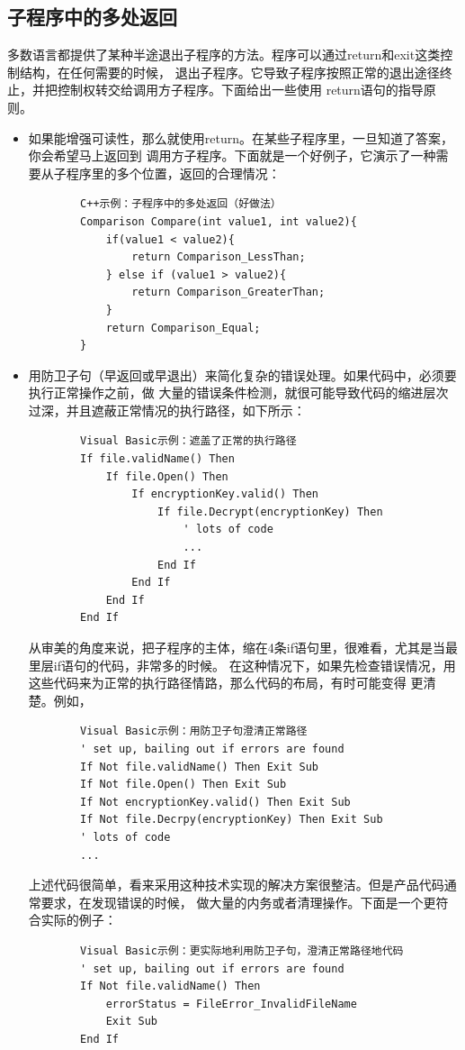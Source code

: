 \documentclass{article}
\begin{document}
\subsection{子程序中的多处返回}
多数语言都提供了某种半途退出子程序的方法。程序可以通过return和exit这类控制结构，在任何需要的时候，
退出子程序。它导致子程序按照正常的退出途径终止，并把控制权转交给调用方子程序。下面给出一些使用
return语句的指导原则。
\begin{itemize}
    \item 如果能增强可读性，那么就使用return。在某些子程序里，一旦知道了答案，你会希望马上返回到
    调用方子程序。下面就是一个好例子，它演示了一种需要从子程序里的多个位置，返回的合理情况：
    \begin{lstlisting}
        C++示例：子程序中的多处返回（好做法）
        Comparison Compare(int value1, int value2){
            if(value1 < value2){
                return Comparison_LessThan;
            } else if (value1 > value2){
                return Comparison_GreaterThan;
            }
            return Comparison_Equal;
        }
    \end{lstlisting}
    \item 用防卫子句（早返回或早退出）来简化复杂的错误处理。如果代码中，必须要执行正常操作之前，做
    大量的错误条件检测，就很可能导致代码的缩进层次过深，并且遮蔽正常情况的执行路径，如下所示：
    \begin{lstlisting}
        Visual Basic示例：遮盖了正常的执行路径
        If file.validName() Then
            If file.Open() Then
                If encryptionKey.valid() Then
                    If file.Decrypt(encryptionKey) Then
                        ' lots of code
                        ...
                    End If
                End If
            End If
        End If
    \end{lstlisting}
    从审美的角度来说，把子程序的主体，缩在4条if语句里，很难看，尤其是当最里层if语句的代码，非常多的时候。
    在这种情况下，如果先检查错误情况，用这些代码来为正常的执行路径情路，那么代码的布局，有时可能变得
    更清楚。例如，
    \begin{lstlisting}
        Visual Basic示例：用防卫子句澄清正常路径
        ' set up, bailing out if errors are found
        If Not file.validName() Then Exit Sub
        If Not file.Open() Then Exit Sub
        If Not encryptionKey.valid() Then Exit Sub
        If Not file.Decrpy(encryptionKey) Then Exit Sub
        ' lots of code
        ...
    \end{lstlisting}
    上述代码很简单，看来采用这种技术实现的解决方案很整洁。但是产品代码通常要求，在发现错误的时候，
    做大量的内务或者清理操作。下面是一个更符合实际的例子：
    \begin{lstlisting}
        Visual Basic示例：更实际地利用防卫子句，澄清正常路径地代码
        ' set up, bailing out if errors are found
        If Not file.validName() Then
            errorStatus = FileError_InvalidFileName
            Exit Sub
        End If


\end{lstlisting}
\end{itemize}
\end{document}
